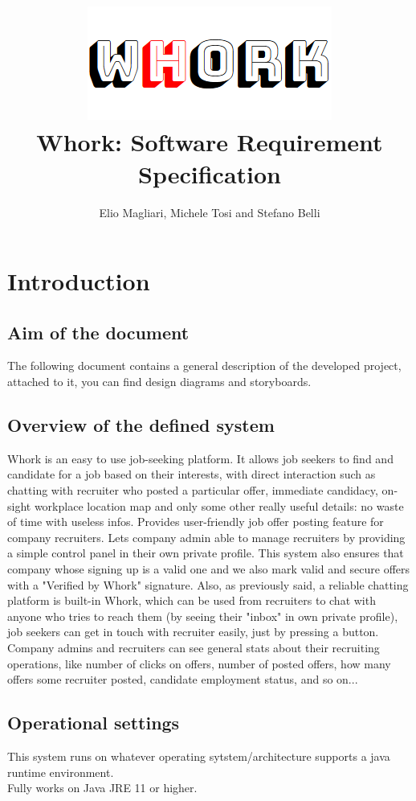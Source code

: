 \documentclass[12pt, a4paper]{article}
\title{\includegraphics{logo.png}\\Whork: Software Requirement Specification}
\author{Elio Magliari, Michele Tosi and Stefano Belli}
\date{}
\begin{document}
\maketitle
\section{Introduction}
\subsection{Aim of the document}
The following document contains a general description of the developed project, attached to it, you can find
design diagrams and storyboards.
\subsection{Overview of the defined system}
Whork is an easy to use job-seeking platform. It allows job seekers to find and candidate for a job based on their interests, with direct interaction such as
chatting with recruiter who posted a particular offer, immediate candidacy, on-sight workplace location map and only some other really useful details: no waste of time with useless infos.
Provides user-friendly job offer posting feature for company recruiters. Lets company admin able to manage recruiters by providing
a simple control panel in their own private profile. This system also ensures that company whose signing up is a valid one and we also mark
valid and secure offers with a "Verified by Whork" signature. Also, as previously said, a reliable chatting platform is built-in Whork, which can be used from recruiters to chat with
anyone who tries to reach them (by seeing their "inbox" in own private profile), job seekers can get in touch with recruiter easily, just by pressing a button. Company admins and recruiters
can see general stats about their recruiting operations, like number of clicks on offers, number of posted offers, how many offers some recruiter posted, candidate employment status, and so on...
\subsection{Operational settings}
This system runs on whatever operating sytstem/architecture supports a java runtime environment.\\
 Fully works on Java JRE 11 or higher.
\end{document}
